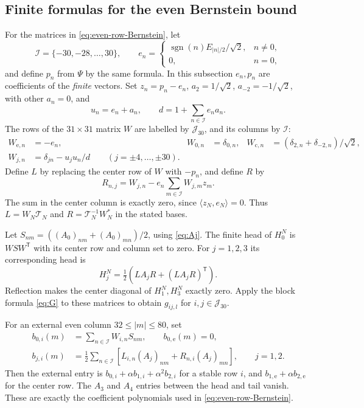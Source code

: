 \documentclass[a4paper,11pt]{article}
\numberwithin{equation}{section}
\theoremstyle{definition}
\theoremstyle{remark}
\newcommand{\ip}[2]{\langle#1,#2\rangle}
\newcommand{\calT}{\mathcal T}
\begin{document}
\subsection{Finite formulas for the even Bernstein bound}
For the matrices in \eqref{eq:even-row-Bernstein}, let
\[
 \mathcal I=\{-30,-28,\ldots,30\},\qquad
 e_n=\begin{cases}\operatorname{sgn}(n)E_{|n|/2}/\sqrt2,&n\ne0,\\0,&n=0,\end{cases}
\]
and define $p_n$ from $\Psi$ by the same formula. In this subsection $e_n,p_n$ are coefficients of the \emph{finite} vectors. Set $z_n=p_n-e_n$, $a_2=1/\sqrt2$, $a_{-2}=-1/\sqrt2$, with other $a_n=0$, and
\[
 u_n=e_n+a_n,\qquad d=1+\sum_{n\in\mathcal I}e_na_n.
\]
The rows of the $31\times31$ matrix $W$ are labelled by $\mathcal J_{30}$, and its columns by $\mathcal I$:
\begin{equation}\label{eq:W-finite}
\begin{aligned}
 W_{\mathrm e,n}&=-e_n,&W_{0,n}&=\delta_{0,n},&
 W_{\mathrm c,n}&=(\delta_{2,n}+\delta_{-2,n})/\sqrt2,\\
 W_{j,n}&=\delta_{jn}-u_ju_n/d\qquad(j=\pm4,\ldots,\pm30).
\end{aligned}
\end{equation}
Define $L$ by replacing the center row of $W$ with $-p_n$, and define $R$ by
\begin{equation}\label{eq:LR-finite}
 R_{n,j}=W_{j,n}-e_n\sum_{m\in\mathcal I}W_{j,m}z_m.
\end{equation}
The sum in the center column is exactly zero, since $\ip{z_N}{e_N}=0$. Thus $L=W_N\calT_N$ and $R=\calT_N^{-1}W_N^*$ in the stated bases.

Let $S_{nm}=((A_0)_{nm}+(A_0)_{mn})/2$, using \eqref{eq:Aj}. The finite head of $H_0^N$ is $WSW^{\mathsf T}$ with its center row and column set to zero. For $j=1,2,3$ its corresponding head is
\[
 H_j^N=\tfrac12\left(LA_jR+(LA_jR)^{\mathsf T}\right).
\]
Reflection makes the center diagonal of $H_1^N,H_3^N$ exactly zero. Apply the block formula \eqref{eq:G} to these matrices to obtain $g_{ij,l}$ for $i,j\in\mathcal J_{30}$.

For an external even column $32\le|m|\le80$, set
\begin{align}
 b_{0,i}(m)&=\sum_{n\in\mathcal I}W_{i,n}S_{nm},\qquad b_{0,\mathrm e}(m)=0,\label{eq:external-b}\\
 b_{j,i}(m)&=\tfrac12\sum_{n\in\mathcal I}
 \left[L_{i,n}(A_j)_{nm}+R_{n,i}(A_j)_{mn}\right],\qquad j=1,2.
 \nonumber
\end{align}
Then the external entry is $b_{0,i}+\alpha b_{1,i}+\alpha^2b_{2,i}$ for a stable row $i$, and $b_{1,\mathrm e}+\alpha b_{2,\mathrm e}$ for the center row. The $A_3$ and $A_4$ entries between the head and tail vanish. These are exactly the coefficient polynomials used in \eqref{eq:even-row-Bernstein}.
\end{document}
